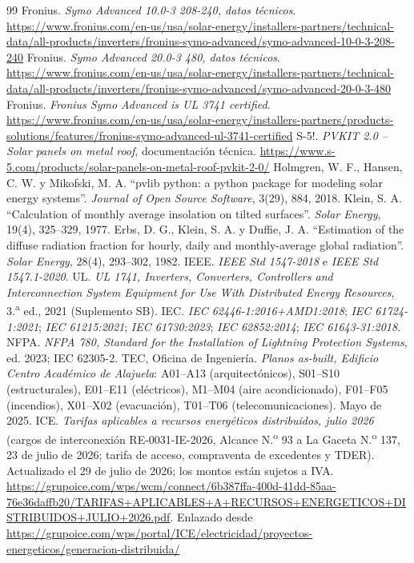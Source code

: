 \documentclass[12pt]{article}
\begin{document}
\begin{thebibliography}{99}
 Fronius. \emph{Symo Advanced 10.0-3 208-240, datos técnicos}. \url{https://www.fronius.com/en-us/usa/solar-energy/installers-partners/technical-data/all-products/inverters/fronius-symo-advanced/symo-advanced-10-0-3-208-240}
 Fronius. \emph{Symo Advanced 20.0-3 480, datos técnicos}. \url{https://www.fronius.com/en-us/usa/solar-energy/installers-partners/technical-data/all-products/inverters/fronius-symo-advanced/symo-advanced-20-0-3-480}
 Fronius. \emph{Fronius Symo Advanced is UL 3741 certified}. \url{https://www.fronius.com/en-us/usa/solar-energy/installers-partners/products-solutions/features/fronius-symo-advanced-ul-3741-certified}
 S-5!. \emph{PVKIT 2.0 -- Solar panels on metal roof}, documentación técnica. \url{https://www.s-5.com/products/solar-panels-on-metal-roof-pvkit-2-0/}
 Holmgren, W. F., Hansen, C. W. y Mikofski, M. A. ``pvlib python: a python package for modeling solar energy systems''. \emph{Journal of Open Source Software}, 3(29), 884, 2018.
 Klein, S. A. ``Calculation of monthly average insolation on tilted surfaces''. \emph{Solar Energy}, 19(4), 325--329, 1977.
 Erbs, D. G., Klein, S. A. y Duffie, J. A. ``Estimation of the diffuse radiation fraction for hourly, daily and monthly-average global radiation''. \emph{Solar Energy}, 28(4), 293--302, 1982.
 IEEE. \emph{IEEE Std 1547-2018} e \emph{IEEE Std 1547.1-2020}.
 UL. \emph{UL 1741, Inverters, Converters, Controllers and Interconnection System Equipment for Use With Distributed Energy Resources}, 3.\textsuperscript{a} ed., 2021 (Suplemento SB).
 IEC. \emph{IEC 62446-1:2016+AMD1:2018}; \emph{IEC 61724-1:2021}; \emph{IEC 61215:2021}; \emph{IEC 61730:2023}; \emph{IEC 62852:2014}; \emph{IEC 61643-31:2018}.
 NFPA. \emph{NFPA 780, Standard for the Installation of Lightning Protection Systems}, ed. 2023; IEC 62305-2.
 TEC, Oficina de Ingeniería. \emph{Planos as-built, Edificio Centro Académico de Alajuela}: A01--A13 (arquitectónicos), S01--S10 (estructurales), E01--E11 (eléctricos), M1--M04 (aire acondicionado), F01--F05 (incendios), X01--X02 (evacuación), T01--T06 (telecomunicaciones). Mayo de 2025.
 ICE. \emph{Tarifas aplicables a recursos energéticos distribuidos, julio 2026} (cargos de interconexión RE-0031-IE-2026, Alcance N.\textsuperscript{o} 93 a La Gaceta N.\textsuperscript{o} 137, 23 de julio de 2026; tarifa de acceso, compraventa de excedentes y TDER). Actualizado el 29 de julio de 2026; los montos están sujetos a IVA. \url{https://grupoice.com/wps/wcm/connect/6b387ffa-400d-41dd-85aa-76e36daffb20/TARIFAS+APLICABLES+A+RECURSOS+ENERGETICOS+DISTRIBUIDOS+JULIO+2026.pdf}. Enlazado desde \url{https://grupoice.com/wps/portal/ICE/electricidad/proyectos-energeticos/generacion-distribuida/}

\end{thebibliography}
\end{document}
